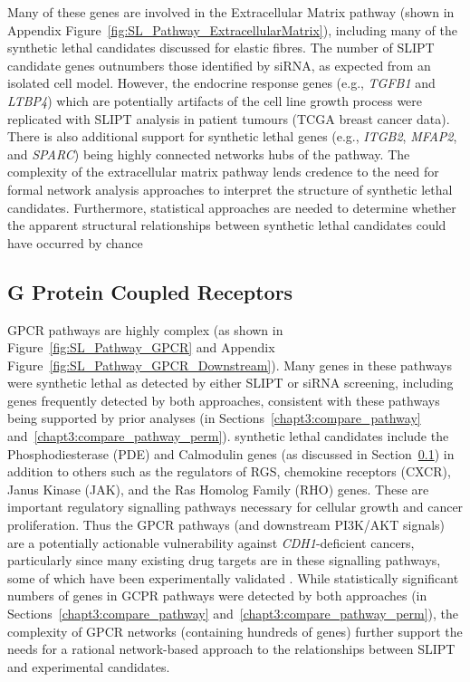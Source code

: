 


Many of these genes are involved in the Extracellular Matrix \gls{pathway} (shown in Appendix Figure~\ref{fig:SL_Pathway_ExtracellularMatrix}), including many of the \gls{synthetic lethal} candidates discussed for elastic fibres. The number of \gls{SLIPT} candidate genes outnumbers those identified by \gls{siRNA}, as expected from an isolated cell model. However, the endocrine response genes (e.g., \textit{TGFB1} and \textit{LTBP4}) which are potentially artifacts of the cell line growth process were replicated with \gls{SLIPT} analysis in patient tumours (TCGA breast cancer data). There is also additional support for \gls{synthetic lethal} genes (e.g., \textit{ITGB2}, \textit{MFAP2}, and \textit{SPARC}) being highly connected networks hubs of the \gls{pathway}. The complexity of the extracellular matrix \gls{pathway} lends credence to the need for formal network analysis approaches to interpret the  structure of \gls{synthetic lethal} candidates. Furthermore, statistical approaches are needed to determine whether the apparent structural relationships between \gls{synthetic lethal} candidates could have occurred by chance 


\subsection{G Protein Coupled Receptors}  \label{chapt4:SL_Genes_GPCR}

\acrfull{GPCR} \glspl{pathway} are highly complex (as shown in Figure~\ref{fig:SL_Pathway_GPCR} and Appendix Figure~\ref{fig:SL_Pathway_GPCR_Downstream}). Many genes in these \glspl{pathway} were \gls{synthetic lethal} as detected by either \gls{SLIPT} or \gls{siRNA} screening, including genes frequently detected by both approaches, consistent with these \glspl{pathway} being supported by prior analyses (in Sections~\ref{chapt3:compare_pathway} and~\ref{chapt3:compare_pathway_perm}). \Gls{synthetic lethal} candidates include the Phosphodiesterase (PDE) and Calmodulin genes (as discussed in Section~\ref{chapt4:SL_Genes_GPCR}) in addition to others such as the regulators of RGS, chemokine receptors (CXCR), Janus Kinase (JAK), and the Ras Homolog Family (RHO) genes. These are important regulatory signalling \glspl{pathway} necessary for cellular growth and cancer proliferation. Thus the \gls{GPCR} \glspl{pathway} (and downstream PI3K/AKT signals) are a potentially actionable vulnerability against \textit{CDH1}-deficient cancers, particularly since many existing drug targets are in these signalling \glspl{pathway}, some of which have been experimentally validated \citep{Telford2015}. While statistically significant numbers of genes in \gls{GCPR} \glspl{pathway} were detected by both approaches (in Sections~\ref{chapt3:compare_pathway} and~\ref{chapt3:compare_pathway_perm}), the complexity of \gls{GPCR} networks (containing hundreds of genes) further support the needs for a rational network-based approach to the relationships between \gls{SLIPT} and experimental candidates.

